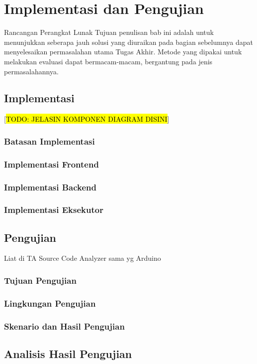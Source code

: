 \chapter{Implementasi dan Pengujian}
Rancangan Perangkat Lunak
Tujuan penulisan bab ini adalah untuk menunjukkan seberapa jauh solusi yang diuraikan pada bagian sebelumnya dapat menyelesaikan permasalahan utama Tugas Akhir. Metode yang dipakai untuk melakukan evaluasi dapat bermacam-macam, bergantung pada jenis permasalahannya.

\section{Implementasi}

 [\hl{TODO: JELASIN KOMPONEN DIAGRAM DISINI}]

\subsection{Batasan Implementasi}
\blindtext

\subsection{Implementasi Frontend}
\blindtext

\subsection{Implementasi Backend}
\blindtext

\subsection{Implementasi Eksekutor}
\blindtext


\section{Pengujian}

Liat di TA Source Code Analyzer sama yg Arduino

\subsection{Tujuan Pengujian}
\blindtext

\subsection{Lingkungan Pengujian}
\blindtext

\subsection{Skenario dan Hasil Pengujian}
\blindtext


\section{Analisis Hasil Pengujian}
\blindtext